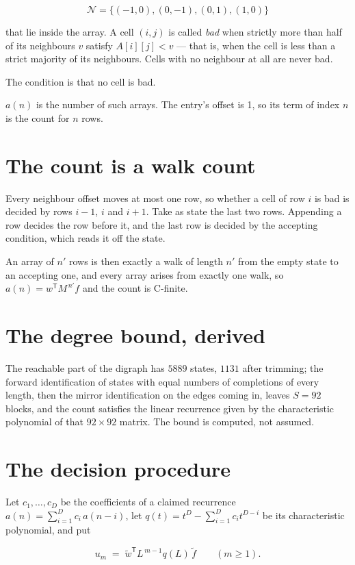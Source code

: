 \documentclass[11pt]{article}
\theoremstyle{definition}
\begin{document}
\[\mathcal{N} = \{(-1,0), (0,-1), (0,1), (1,0)\}\]

that lie inside the array. A cell $(i,j)$ is called {\itshape bad} when strictly more than half of its neighbours $v$ satisfy $A[i][j] < v$ --- that is, when the cell is less than a strict majority of its neighbours. Cells with no neighbour at all are never bad.

The condition is that no cell is bad.

$a(n)$ is the number of such arrays. The entry's offset is 1, so its term of index $n$ is the count for $n$ rows.

\section{The count is a walk count}

Every neighbour offset moves at most one row, so whether a cell of row $i$ is bad is decided by rows $i-1$, $i$ and $i+1$. Take as state the last two rows. Appending a row decides the row before it, and the last row is decided by the accepting condition, which reads it off the state.

An array of $n'$ rows is then exactly a walk of length $n'$ from the empty state to an accepting one, and every array arises from exactly one walk, so $a(n) = w^{\mathsf T}M^{\,n'}f$ and the count is C-finite.

\section{The degree bound, derived}

The reachable part of the digraph has $5889$ states, $1131$ after trimming; the forward identification of states with equal numbers of completions of every length, then the mirror identification on the edges coming in, leaves $S = 92$ blocks, and the count satisfies the linear recurrence given by the characteristic polynomial of that $92\times92$ matrix. The bound is computed, not assumed.

\section{The decision procedure}

Let $c_1,\dots,c_D$ be the coefficients of a claimed recurrence $a(n) = \sum_{i=1}^{D} c_i\,a(n-i)$, let $q(t) = t^{D} - \sum_{i=1}^{D} c_i t^{D-i}$ be its characteristic polynomial, and put

\[u_m \;=\; \tilde w^{\mathsf T} L^{\,m-1} q(L)\,\tilde f \qquad (m \ge 1).\]
\end{document}

